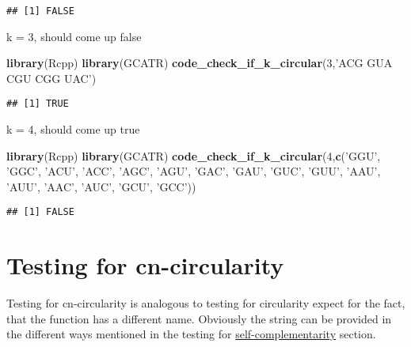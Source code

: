 \documentclass[
]{article}
\newenvironment{Shaded}{\begin{snugshade}}{\end{snugshade}}
\newcommand{\DecValTok}[1]{\textcolor[rgb]{0.00,0.00,0.81}{#1}}
\newcommand{\KeywordTok}[1]{\textcolor[rgb]{0.13,0.29,0.53}{\textbf{#1}}}
\newcommand{\NormalTok}[1]{#1}
\newcommand{\StringTok}[1]{\textcolor[rgb]{0.31,0.60,0.02}{#1}}
\begin{document}
\begin{verbatim}
## [1] FALSE
\end{verbatim}

k = 3, should come up false

\begin{Shaded}
\begin{Highlighting}[]
\KeywordTok{library}\NormalTok{(Rcpp)}
\KeywordTok{library}\NormalTok{(GCATR)}
\KeywordTok{code_check_if_k_circular}\NormalTok{(}\DecValTok{3}\NormalTok{,}\StringTok{'ACG GUA CGU CGG UAC'}\NormalTok{)}
\end{Highlighting}
\end{Shaded}

\begin{verbatim}
## [1] TRUE
\end{verbatim}

k = 4, should come up true

\begin{Shaded}
\begin{Highlighting}[]
\KeywordTok{library}\NormalTok{(Rcpp)}
\KeywordTok{library}\NormalTok{(GCATR)}
\KeywordTok{code_check_if_k_circular}\NormalTok{(}\DecValTok{4}\NormalTok{,}\KeywordTok{c}\NormalTok{(}\StringTok{'GGU'}\NormalTok{, }\StringTok{'GGC'}\NormalTok{, }\StringTok{'ACU'}\NormalTok{, }\StringTok{'ACC'}\NormalTok{, }\StringTok{'AGC'}\NormalTok{, }\StringTok{'AGU'}\NormalTok{, }\StringTok{'GAC'}\NormalTok{, }\StringTok{'GAU'}\NormalTok{, }\StringTok{'GUC'}\NormalTok{, }\StringTok{'GUU'}\NormalTok{, }\StringTok{'AAU'}\NormalTok{, }\StringTok{'AUU'}\NormalTok{, }\StringTok{'AAC'}\NormalTok{, }\StringTok{'AUC'}\NormalTok{, }\StringTok{'GCU'}\NormalTok{, }\StringTok{'GCC'}\NormalTok{))}
\end{Highlighting}
\end{Shaded}

\begin{verbatim}
## [1] FALSE
\end{verbatim}

\hypertarget{testing-for-cn-circularity}{%
\section{Testing for cn-circularity}\label{testing-for-cn-circularity}}

Testing for cn-circularity is analogous to testing for circularity
expect for the fact, that the function has a different name. Obviously
the string can be provided in the different ways mentioned in the
testing for \protect\hyperlink{self-complementary}{self-complementarity}
section.
\end{document}

